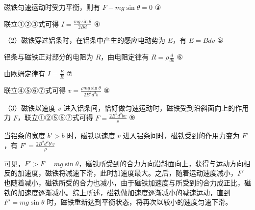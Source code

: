 \documentclass[\gkver]{gaokaozhenti}
\begin{document}
\begin{enumerate}[resume]
{磁铁匀速运动时受力平衡，则有 $F - mg \sin \theta = 0$ ③

联立①②③式可得 $I = \frac{mg \sin \theta}{2Bd}$ ④

（2）磁铁穿过铝条时，在铝条中产生的感应电动势为 $E$，有 $E = Bdv$ ⑤

铝条与磁铁正对部分的电阻为 $R$，由电阻定律有 $R = \rho \frac{d}{db}$ ⑥

由欧姆定律有 $I = \frac{E}{R}$ ⑦

联立④⑤⑥⑦式可得 $v = \frac{\rho mg \sin \theta}{2B^{2}d^{2}b}$ ⑧

（3）磁铁以速度 $v$ 进入铝条间，恰好做匀速运动时，磁铁受到沿斜面向上的作用力 $F$，联立①②⑤⑥⑦式可得 $F = \frac{2B^{2}d^{2}bv}{\rho}$ ⑨

当铝条的宽度 $b' > b$ 时，磁铁以速度 $v$ 进入铝条间时，磁铁受到的作用力变为 $F'$，有 $F' = \frac{2B^{2}d^{2}b'v}{\rho}$

可见，$F' > F = mg\sin\theta$，磁铁所受到的合力方向沿斜面向上，获得与运动方向相反的加速度，磁铁将减速下滑，此时加速度最大。之后，随着运动速度减小，$F'$ 也随着减小，磁铁所受的合力也减小，由于磁铁加速度与所受到的合力成正比，磁铁的加速度逐渐减小。综上所述，磁铁做加速度逐渐减小的减速运动，直到 $F' = mg\sin\theta$ 时，磁铁重新达到平衡状态，将再次以较小的速度匀速下滑。
}

\end{enumerate}
\end{document}
